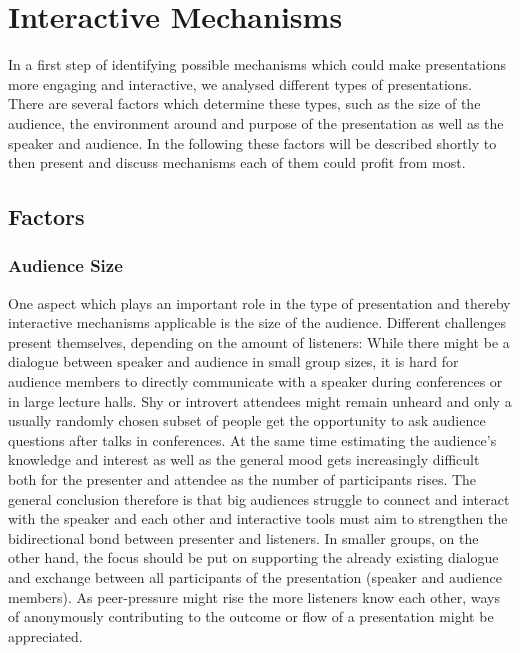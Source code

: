 \chapter{Interactive Mechanisms}
\label{cha:mechanisms}

In a first step of identifying possible mechanisms which could make presentations more engaging and interactive, we analysed different types of presentations. There are several factors which determine these types, such as the size of the audience, the environment around and purpose of the presentation as well as the speaker and audience. In the following these factors will be described shortly to then present and discuss mechanisms each of them could profit from most.

\section{Factors}

\subsection{Audience Size}
One aspect which plays an important role in the type of presentation and thereby interactive mechanisms applicable is the size of the audience. Different challenges present themselves, depending on the amount of listeners: While there might be a dialogue between speaker and audience in small group sizes, it is hard for audience members to directly communicate with a speaker during conferences or in large lecture halls. Shy or introvert attendees might remain unheard \cite{Bry:Backstage} and only a usually randomly chosen subset of people get the opportunity to ask audience questions after talks in conferences. At the same time estimating the audience's knowledge and interest as well as the general mood gets increasingly difficult both for the presenter and attendee as the number of participants rises. 
The general conclusion therefore is that big audiences struggle to connect and interact with the speaker and each other and interactive tools must aim to strengthen the bidirectional bond between presenter and listeners. In smaller groups, on the other hand, the focus should be put on supporting the already existing dialogue and exchange between all participants of the presentation (speaker and audience members). As peer-pressure might rise the more listeners know each other, ways of anonymously contributing to the outcome or flow of a presentation might be appreciated.

